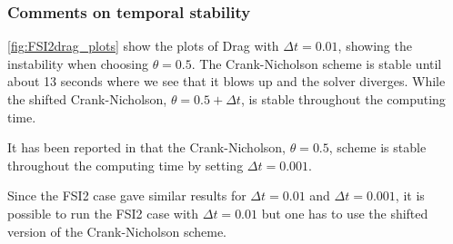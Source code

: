 \subsubsection*{Comments on temporal stability}
\ref{fig:FSI2drag_plots} show the plots of Drag with $\Delta t = 0.01$, showing the instability when choosing $\theta = 0.5$. The Crank-Nicholson scheme is stable until about 13 seconds where we see that it blows up and the solver diverges. While the shifted Crank-Nicholson, $\theta = 0.5 + \Delta t$, is stable throughout the computing time.\newline

It has been reported in \cite{Wick2011} that the Crank-Nicholson, $\theta = 0.5$, scheme is stable throughout the computing time by setting $\Delta t = 0.001$.

Since the FSI2 case gave similar results for $\Delta t = 0.01$ and $\Delta t = 0.001$, it is possible to run the FSI2 case with $\Delta t = 0.01$ but one has to use the shifted version of the Crank-Nicholson scheme.




